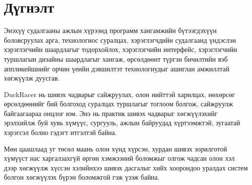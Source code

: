 \chapter{Дүгнэлт}
Энэхүү судалгааны ажлын хүрээнд программ хангамжийн бүтээгдэхүүн боловсруулах арга, технологиос суралцах, хэрэглэгчдийн судалгаанд үндэслэн хэрэглэгчийн шаардлагыг тодорхойлох, хэрэглэгчийн интерфейс, хэрэглэгчийн туршлагын дизайны шаардлагыг хангаж, өрсөлдөөнт түргэн бичилтийн вэб аппликейшнийг орчин үеийн дэвшилтэт технологиудыг ашиглан амжиллтай хөгжүүлж дуусгав.

DuckRacer нь шивэх чадварыг сайжруулах, олон нийттэй харилцах, нөхөрсөг өрсөлдөөнийг бий болгоход суралцах туршлагыг тоглоом болгож, сайжруулж байгаагаараа онцлог юм. Энэ нь практик шивэх чадварыг хөгжүүлэхийг эрэлхийлж буй хувь хүмүүс, сургууль, ажлын байруудад хүртээмжтэй, зугаатай хэрэгсэл болно гэдэгт итгэлтэй байна.

Мөн цаашлаад уг төсөл маань олон хүнд хүрсэн, хурдан шивэх зорилготой хүмүүст нас харгалзахгүй өргөн хэмжээний боломжыг олгож чадсан олон хэл дээр хөгжүүлж хүссэн хэлийнхээ шивэх дасгалыг хийх хоорондоо уралдах систем болгон хөгжүүлэх бүрэн боломжгой гэж үзэж байна.